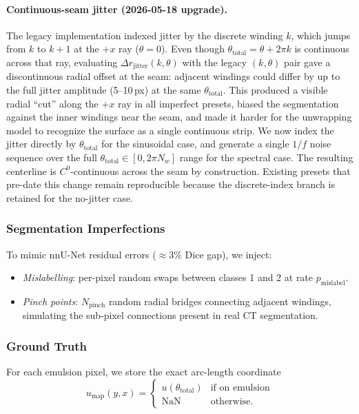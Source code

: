 \documentclass[11pt,a4paper]{article}
\begin{document}
\paragraph{Continuous-seam jitter (2026-05-18 upgrade).} The legacy implementation indexed jitter by the discrete winding $k$, which jumps from $k$ to $k+1$ at the $+x$ ray ($\theta = 0$). Even though $\theta_{\text{total}} = \theta + 2\pi k$ is continuous across that ray, evaluating $\Delta r_{\text{jitter}}(k, \theta)$ with the legacy $(k, \theta)$ pair gave a discontinuous radial offset at the seam: adjacent windings could differ by up to the full jitter amplitude (5--10\,px) at the same $\theta_{\text{total}}$. This produced a visible radial ``cut'' along the $+x$ ray in all imperfect presets, biased the segmentation against the inner windings near the seam, and made it harder for the unwrapping model to recognize the surface as a single continuous strip. We now index the jitter directly by $\theta_{\text{total}}$ for the sinusoidal case, and generate a single $1/f$ noise sequence over the full $\theta_{\text{total}} \in [0, 2\pi N_w]$ range for the spectral case. The resulting centerline is $C^0$-continuous across the seam by construction. Existing presets that pre-date this change remain reproducible because the discrete-index branch is retained for the no-jitter case.

\subsubsection{Segmentation Imperfections}

To mimic nnU-Net residual errors ($\approx 3\%$ Dice gap), we inject:
\begin{itemize}
    \item \textit{Mislabelling}: per-pixel random swaps between classes 1 and 2 at rate $p_{\text{mislabel}}$.
    \item \textit{Pinch points}: $N_{\text{pinch}}$ random radial bridges connecting adjacent windings, simulating the sub-pixel connections present in real CT segmentation.
\end{itemize}

\subsubsection{Ground Truth}

For each emulsion pixel, we store the exact arc-length coordinate
\begin{equation}
    u_{\text{map}}(y,x) = \begin{cases} u(\theta_{\text{total}}) & \text{if on emulsion} \\ \text{NaN} & \text{otherwise.} \end{cases}
\end{equation}
\end{document}
